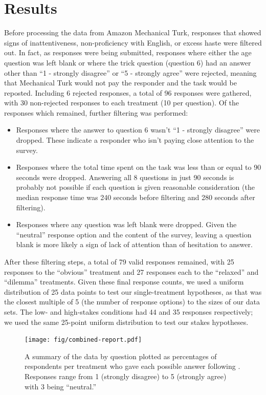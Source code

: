 \section{Results}

Before processing the data from Amazon Mechanical Turk, responses that showed signs of inattentiveness, non-proficiency with English, or excess haste were filtered out.
%
In fact, as responses were being submitted, responses where either the age question was left blank or where the trick question (question 6) had an answer other than ``1 - strongly disagree'' or ``5 - strongly agree'' were rejected, meaning that Mechanical Turk would not pay the responder and the task would be reposted.
%
Including 6 rejected responses, a total of 96 responses were gathered, with 30 non-rejected responses to each treatment (10 per question).
%
Of the responses which remained, further filtering was performed:
%
\begin{itemize}
  \item Responses where the answer to question 6 wasn't ``1 - strongly disagree'' were dropped. These indicate a responder who isn't paying close attention to the survey.
  \item Responses where the total time spent on the task was less than or equal to 90 seconds were dropped. Answering all 8 questions in just 90 seconds is probably not possible if each question is given reasonable consideration (the median response time was 240 seconds before filtering and 280 seconds after filtering).
  \item Responses where any question was left blank were dropped. Given the ``neutral'' response option and the content of the survey, leaving a question blank is more likely a sign of lack of attention than of hesitation to answer.
\end{itemize}
%
After these filtering steps, a total of 79 valid responses remained, with 25 responses to the ``obvious'' treatment and 27 responses each to the ``relaxed'' and ``dilemma'' treatments.
%
Given these final response counts, we used a uniform distribution of 25 data points to test our single-treatment hypotheses, as that was the closest multiple of 5 (the number of response options) to the sizes of our data sets.
%
The low- and high-stakes conditions had 44 and 35 responses respectively; we used the same 25-point uniform distribution to test our stakes hypotheses.


\begin{figure}[hp!]
  \centering
  \texttt{[image: fig/combined-report.pdf]}
  \caption{A summary of the data by question plotted as percentages of respondents per treatment who gave each possible answer following \citep{Robbins2011}. Responses range from 1 (strongly disagree) to 5 (strongly agree) with 3 being ``neutral.''}
  \label{fig:report}
\end{figure}


